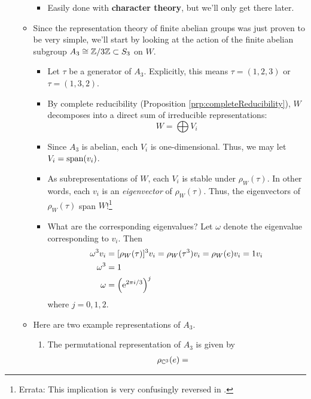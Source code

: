 \documentclass[../notes.tex]{subfiles}
\begin{document}
\begin{itemize}
\begin{itemize}
        \begin{itemize}
            \item Easily done with \textbf{character theory}, but we'll only get there later.
        \end{itemize}
        \item Since the representation theory of finite abelian groups was just proven to be very simple, we'll start by looking at the action of the finite abelian subgroup $A_3\cong\Z/3\Z\subset S_3$ on $W$.
        \begin{itemize}
            \item Let $\tau$ be a generator of $A_3$. Explicitly, this means $\tau=(1,2,3)$ or $\tau=(1,3,2)$.
            \item By complete reducibility (Proposition \ref{prp:completeReducibility}), $W$ decomposes into a direct sum of irreducible representations:
            \begin{equation*}
                W = \bigoplus V_i
            \end{equation*}
            \item Since $A_3$ is abelian, each $V_i$ is one-dimensional. Thus, we may let $V_i=\spn(v_i)$.
            \item As subrepresentations of $W$, each $V_i$ is stable under $\rho_W(\tau)$. In other words, each $v_i$ is an \emph{eigenvector} of $\rho_W(\tau)$. Thus, the eigenvectors of $\rho_W(\tau)$ span $W$!\footnote{Errata: This implication is very confusingly reversed in \textcite{bib:FultonHarris}.}
            \item What are the corresponding eigenvalues? Let $\omega$ denote the eigenvalue corresponding to $v_i$. Then
            \begin{align*}
                \omega^3v_i &= [\rho_W(\tau)]^3v_i = \rho_W(\tau^3)v_i = \rho_W(e)v_i = 1v_i\\
                \omega^3 &= 1\\
                \omega &= \left( \e[2\pi i/3] \right)^j
            \end{align*}
            where $j=0,1,2$.
        \end{itemize}
        \item Here are two example representations of $A_3$.
        \begin{enumerate}
            \item The permutational representation of $A_3$ is given by
            \begin{align*}
                \rho_{\C^3}(e) &=

\end{align*}
\end{enumerate}
\end{itemize}
\end{itemize}
\end{document}
